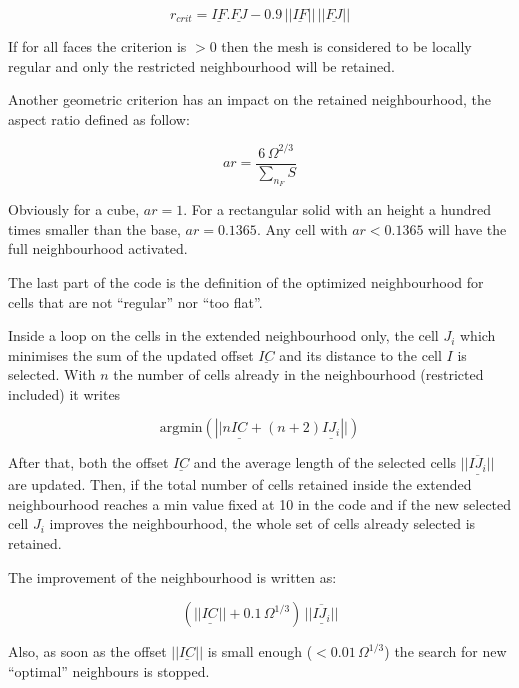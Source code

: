 \begin{equation}
  r_{crit} = \underline{IF}.\underline{FJ}
  - 0.9 \, ||\underline{IF}|| \, ||\underline{FJ}||
  \label{eqn:reg_crit}
\end{equation}

If for all faces the criterion is $>0$ then the mesh is considered to be locally regular
and only the restricted neighbourhood will be retained.

Another geometric criterion has an impact on the retained neighbourhood, the
aspect ratio defined as follow:

\begin{equation}
  ar = \frac{6\,\Omega^{2/3}}{\sum_{n_F} S}
  \label{eqn:aspect_r}
\end{equation}

Obviously for a cube, $ar = 1$. For a rectangular solid with an height a hundred
times smaller than the base, $ar = 0.1365$. Any cell with $ar < 0.1365$ will have
the full neighbourhood activated.

The last part of the code is the definition of the optimized neighbourhood for
cells that are not ``regular'' nor ``too flat''.

Inside a loop on the cells in the extended neighbourhood only,
the cell $J_i$ which minimises the sum of the updated offset $\underline{IC}$
and its distance to the cell $I$ is selected. With $n$ the number
of cells already in the neighbourhood (restricted included) it writes

\begin{equation}
  \mbox{argmin} \left(\left||n\underline{IC_{}}+(n+2)\underline{IJ_i}\right||\right)
  \label{eqn:loc_crit}
\end{equation}

After that, both the offset $\underline{IC}$ and the average length of the
selected cells $\overline{||\underline{IJ_i}||}$
are updated. Then, if the total number of cells retained inside the
extended neighbourhood reaches a min value fixed at 10 in the code and if
the new selected cell $J_i$ improves the neighbourhood, the whole set of
cells already selected is retained.

The improvement of the neighbourhood is written as:

\begin{equation}
  \left( ||\underline{IC_{}}|| + 0.1\,\Omega^{1/3} \right) \, \overline{||\underline{IJ_i}||}
  \label{eqn:crit}
\end{equation}

Also, as soon as the offset $||\underline{IC}||$ is small enough ($ < 0.01\, \Omega^{1/3}$)
the search for new ``optimal'' neighbours is stopped.

